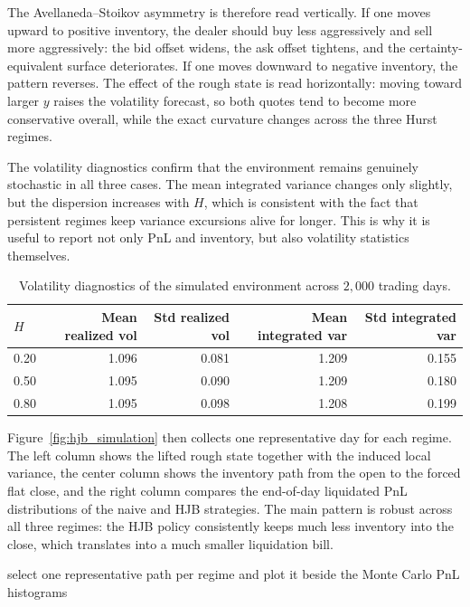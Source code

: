 \documentclass[a4paper,10pt,titlepage,oneside,openany]{book}
\theoremstyle{plain}
\theoremstyle{definition}
\theoremstyle{remark}
\newcommand{\1}{\mathbf{1}}
\begin{document}
The Avellaneda--Stoikov asymmetry is therefore read vertically. If one moves upward to positive inventory, the dealer should buy less aggressively and sell more aggressively: the bid offset widens, the ask offset tightens, and the certainty-equivalent surface deteriorates. If one moves downward to negative inventory, the pattern reverses. The effect of the rough state is read horizontally: moving toward larger \(y\) raises the volatility forecast, so both quotes tend to become more conservative overall, while the exact curvature changes across the three Hurst regimes.

The volatility diagnostics confirm that the environment remains genuinely stochastic in all three cases. The mean integrated variance changes only slightly, but the dispersion increases with \(H\), which is consistent with the fact that persistent regimes keep variance excursions alive for longer. This is why it is useful to report not only PnL and inventory, but also volatility statistics themselves.

\begin{table}[H]
\centering
\caption{Volatility diagnostics of the simulated environment across \(2{,}000\) trading days.}
\label{tab:hjb_vol_diagnostics}
\begin{tabular}{@{}lrrrr@{}}
\toprule
\(H\) & Mean realized vol & Std realized vol & Mean integrated var & Std integrated var \\
\midrule
0.20 & 1.096 & 0.081 & 1.209 & 0.155 \\
0.50 & 1.095 & 0.090 & 1.209 & 0.180 \\
0.80 & 1.095 & 0.098 & 1.208 & 0.199 \\
\bottomrule
\end{tabular}
\end{table}

Figure~\ref{fig:hjb_simulation} then collects one representative day for each regime. The left column shows the lifted rough state together with the induced local variance, the center column shows the inventory path from the open to the forced flat close, and the right column compares the end-of-day liquidated PnL distributions of the naive and HJB strategies. The main pattern is robust across all three regimes: the HJB policy consistently keeps much less inventory into the close, which translates into a much smaller liquidation bill.

\begin{algorithm}[H]
\caption{Reading the close-out simulation figure}
\DontPrintSemicolon
{}
select one representative path per regime and plot it beside the Monte Carlo PnL histograms\;
\end{algorithm}
\end{document}

